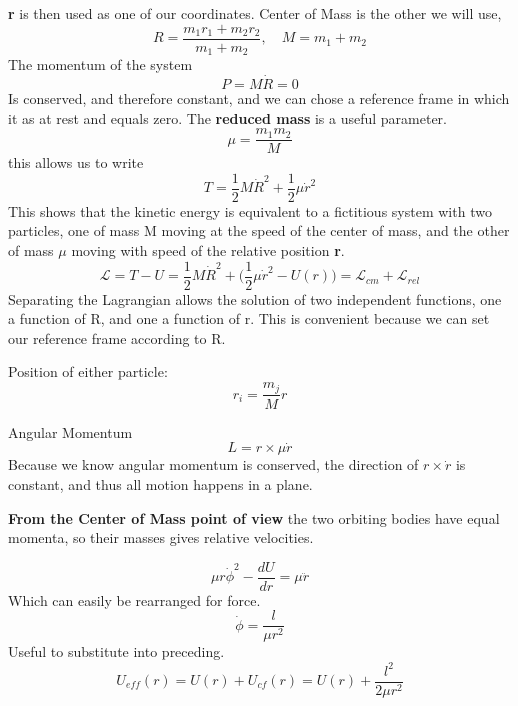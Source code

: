 \hfill
\hfill

\textbf{r}  is then used as one of our coordinates. Center of Mass is the other we will use,
\begin{equation}
	\label{}
	R=\frac{m_{1}r_{1}+m_{2}r_{2}}{m_{1}+m_{2}},\quad M=m_{1}+m_{2}
\end{equation}
The momentum of the system
\begin{equation}
	\label{}
	P=M\dot{R}=0
\end{equation}
Is conserved, and therefore constant, and we can chose a reference frame in which it as at rest and equals zero. The \textbf{reduced mass} is a useful parameter.
\begin{equation}
	\label{}
	\mu=\frac{m_{1}m_{2}}{M}
\end{equation}
this allows us to write
\begin{equation}
	\label{}
	T=\frac{1}{2}M\dot{R}^{2}+\frac{1}{2}\mu\dot{r}^{2}
\end{equation}
This shows that the kinetic energy is equivalent to a fictitious system with two particles, one  of mass M moving at the speed of the center of mass, and the other of mass $\mu$ moving with speed of the relative position \textbf{r}. 
\begin{equation}
	\label{}
	\mathcal{L}=T-U=\frac{1}{2}M\dot{R}^{2}+\bigg(\frac{1}{2}\mu\dot{r}^{2}-U(r)\bigg)=\mathcal{L}_{cm}+\mathcal{L}_{rel}
\end{equation}
Separating the Lagrangian allows the solution of two independent functions, one a function of R, and one a function of r. This is convenient because we can set our reference frame according to R. 

Position of either particle:
\begin{equation}
	\label{}
	r_{i}=\frac{m_{j}}{M}r
\end{equation}

Angular Momentum
\begin{equation}
	\label{}
	L=r \times \mu\dot{r}
\end{equation}
Because we know angular momentum is conserved, the direction of $r \times \dot{r}$ is constant, and thus all motion happens in a plane. 

\textbf{From the Center of Mass point of view} the two orbiting bodies have equal momenta, so their masses gives relative velocities. 

\begin{equation}
	\label{}
	\mu r \dot{\phi}^{2}-\frac{dU}{dr}=\mu\ddot{r}
\end{equation}
Which can easily be rearranged for force.
\begin{equation}
	\label{}
	\dot{\phi}=\frac{l}{\mu r^{2}}
\end{equation}
Useful to substitute into preceding. 
\begin{equation}
	\label{}
	U_{eff}(r)=U(r)+U_{cf}(r)=U(r)+\frac{l^{2}}{2\mu r^{2}}
\end{equation}

